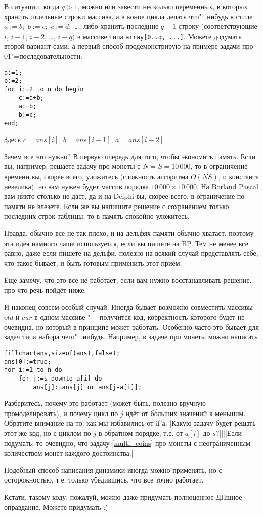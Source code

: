 В ситуации, когда $q>1$, можно или завести несколько переменных, в которых хранить отдельные строки массива, а в конце цикла
делать что"=нибудь в стиле $a:=b;$ $b:=c;$ $c:=d;$ \dots, либо хранить последние $q+1$ строку (соответствующие
$i$, $i-1$, $i-2$, \dots, $i-q$) в массиве типа \texttt{array[0..q, ...]}. Можете додумать второй вариант сами,
а первый способ продемонстрирую на примере задачи про 01"=последовательности:
\begin{codesampleo}\begin{verbatim}
a:=1;
b:=2;
for i:=2 to n do begin
    c:=a+b;
    a:=b;
    b:=c;
end;
\end{verbatim}\end{codesampleo}
Здесь $c=ans[i]$, $b=ans[i-1]$, $a=ans[i-2]$.

Зачем все это нужно? В первую очередь для того, чтобы экономить память. Если вы, например, решаете задачу про монеты
с $N=S=10\,000$, то в ограничение времени вы, скорее всего, уложитесь (сложность алгоритма $O(NS)$, и константа невелика),
но вам нужен будет массив порядка $10\,000\times 10\,000$. На Borland Pascal
вам никто столько не даст, да и на Delphi вы, скорее всего, в ограничение по памяти не влезете. 
Если же вы напишите решение с сохранением только последних строк таблицы,
то в память спокойно уложитесь.

Правда, обычно все не так плохо, и на дельфях памяти обычно хватает, поэтому эта идея намного чаще 
используется, если вы пишете на BP. Тем не менее все равно, даже если пишете на дельфи, полезно на всякий случай 
представлять себе, что такое бывает, и быть готовым применить этот приём.

Ещё замечу, что это все не работает, если вам нужно восстанавливать решение, про что речь пойдёт ниже.

И наконец совсем особый случай. Иногда бывает возможно совместить массивы $old$ и $cur$ в одном 
массиве "--- получится код, корректность которого будет не очевидна, но который в принципе может работать. Особенно часто 
это бывает для задач типа набора чего"=нибудь. Например, в задаче про монеты можно написать 
\begin{codesampleo}\begin{verbatim}
fillchar(ans,sizeof(ans),false);
ans[0]:=true;
for i:=1 to n do
    for j:=s downto a[i] do
        ans[j]:=ans[j] or ans[j-a[i]];
\end{verbatim}\end{codesampleo}

Разберитесь, почему это работает (может быть, полезно вручную промоделировать), и почему цикл по 
$j$ идёт от б\'{о}льших значений к меньшим. Обратите внимание на то, как мы избавились от if'а.
\task|Какую задачу будет решать этот же код, но с циклом по $j$ в обратном порядке, т.е.
от $a[i]$ до $s$?||||Если подумать, то очевидно, что задачу \ref{multi_coins} про монеты с неограниченным количеством монет каждого достоинства.|

Подобный способ написания динамики иногда можно применять, но с осторожностью, т.е. только 
убедившись, что все точно работает. 

Кстати, такому коду, пожалуй, можно даже придумать полноценное ДПшное оправдание. Можете придумать 
:)